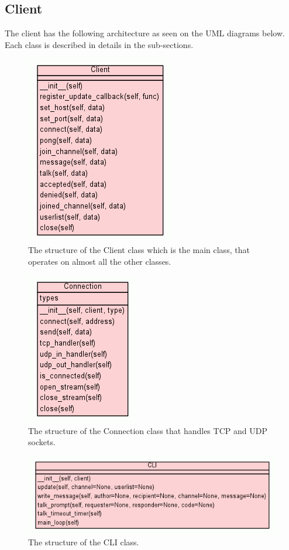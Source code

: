 \documentclass[12pt]{rapport}
\begin{document}
\subsection*{Client}
The client has the following architecture as seen on the UML
diagrams below. Each class is described in details in the sub-sections.
\begin{figure}[H]
  \begin{center}
    \includegraphics[scale=0.9]{../uml/uml_class_diagram_for_voix_cli}
    \caption{The structure of the Client class which is the main class,
      that operates on almost all the other classes.}
  \end{center}
\end{figure}
\begin{figure}[H]
  \begin{center}
    \includegraphics[scale=0.9]{../uml/uml_class_diagram_for_voix_con}
    \caption{The structure of the Connection class that handles TCP
      and UDP sockets.}
  \end{center}
\end{figure}
\begin{figure}[H]
  \begin{center}
    \includegraphics[scale=0.9]{../uml/uml_class_diagram_for_voix_int}
    \caption{The structure of the CLI class.}
  \end{center}
\end{figure}
\end{document}
